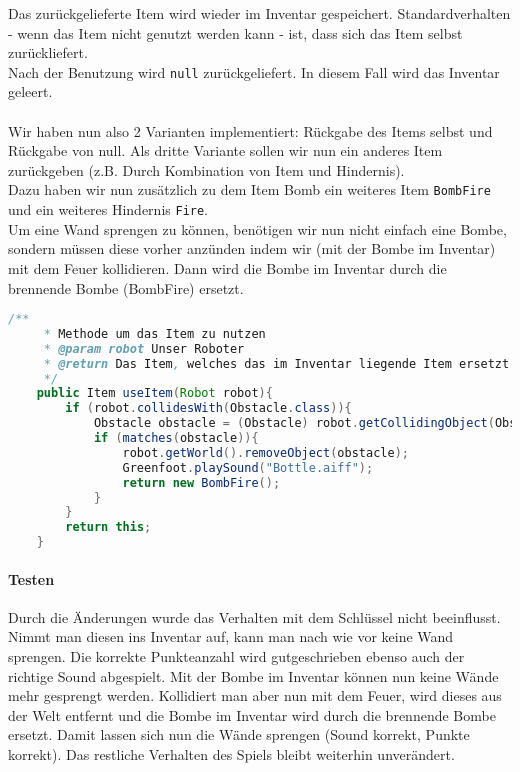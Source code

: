 \documentclass{pi1}
\begin{document}
Das zurückgelieferte Item wird wieder im Inventar gespeichert. Standardverhalten - wenn das Item nicht genutzt werden kann - ist, dass sich das Item selbst zurückliefert.\\
Nach der Benutzung wird \texttt{null} zurückgeliefert. In diesem Fall wird das Inventar geleert.\\
\\
Wir haben nun also 2 Varianten implementiert: Rückgabe des Items selbst und Rückgabe von null. Als dritte Variante sollen wir nun ein anderes Item zurückgeben (z.B. Durch Kombination von Item und Hindernis).\\
Dazu haben wir nun zusätzlich zu dem Item Bomb ein weiteres Item \texttt{BombFire} und ein weiteres Hindernis \texttt{Fire}.\\
Um eine Wand sprengen zu können, benötigen wir nun nicht einfach eine Bombe, sondern müssen diese vorher anzünden indem wir (mit der Bombe im Inventar) mit dem Feuer kollidieren. Dann wird die Bombe im Inventar durch die brennende Bombe (BombFire) ersetzt.

\begin{lstlisting}[caption={Klasse \emph{Bomb}, Methode \emph{useItem()}},firstnumber=11, language=Java]
/**
     * Methode um das Item zu nutzen
     * @param robot Unser Roboter
     * @return Das Item, welches das im Inventar liegende Item ersetzt
     */
    public Item useItem(Robot robot){
        if (robot.collidesWith(Obstacle.class)){
            Obstacle obstacle = (Obstacle) robot.getCollidingObject(Obstacle.class);
            if (matches(obstacle)){
                robot.getWorld().removeObject(obstacle);
                Greenfoot.playSound("Bottle.aiff");
                return new BombFire();
            }
        }
        return this;
    }
\end{lstlisting}

\paragraph{Testen} Durch die Änderungen wurde das Verhalten mit dem Schlüssel nicht beeinflusst. Nimmt man diesen ins Inventar auf, kann man nach wie vor keine Wand sprengen. Die korrekte Punkteanzahl wird gutgeschrieben ebenso auch der richtige Sound abgespielt. Mit der Bombe im Inventar können nun keine Wände mehr gesprengt werden. Kollidiert man aber nun mit dem Feuer, wird dieses aus der Welt entfernt und die Bombe im Inventar wird durch die brennende Bombe ersetzt. Damit lassen sich nun die Wände sprengen (Sound korrekt, Punkte korrekt). Das restliche Verhalten des Spiels bleibt weiterhin unverändert.
\end{document}
